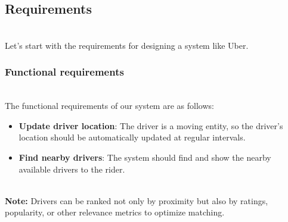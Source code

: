 

\subsection{Requirements}\label{il2d43JNa_obTDtmmPFUV}
\\
Let's start with the requirements for designing a system like Uber.

\subsubsection{Functional requirements}\label{ibir-FW8M1oyMeeBjQ3F8}
\\
The functional requirements of our system are as follows:

\begin{itemize}
\item
\protect{}\label{jFlEI8AG2YR8OIyg4Vrv7}
\textbf{Update driver location}: The driver is a moving entity, so the driver's location should be automatically updated at regular intervals.
\item
\protect{}\label{LPYd-OiWZyI8EOf-RAzAd}
\textbf{Find nearby drivers}: The system should find and show the nearby available drivers to the rider.
\end{itemize}
\\
\textbf{Note:} Drivers can be ranked not only by proximity but also by ratings, popularity, or other relevance metrics to optimize matching.

